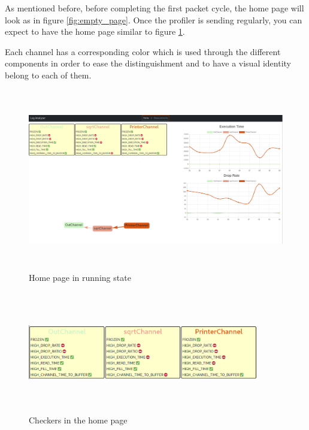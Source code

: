 As mentioned before, before completing the first packet cycle, the home page will look as in figure \ref{fig:empty_page}.
Once the profiler is sending regularly, you can expect to have the home page similar to figure \ref{fig:home_page_running_state}.

Each channel has a corresponding color which is used through the different components in order to ease the
distinguishment and to have a visual identity belong to each of them.
\newline
\begin{figure}[H]
	\centering
	\includegraphics[width=1.0\textwidth,height=300px]{images/home_page_in_running_state.png}
	\caption{Home page in running state}
	\label{fig:home_page_running_state}
\end{figure}

\begin{figure}[H]
	\centering
	\includegraphics[width=0.9\textwidth,height=200px]{images/checkers_home_page.png}
	\caption{Checkers in the home page}
	\label{fig:checkers_home_page}
\end{figure}

